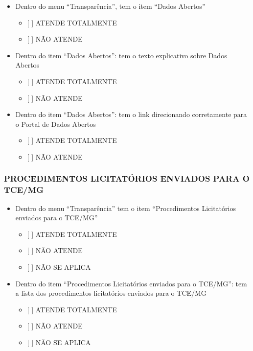 \documentclass[]{book}
\providecommand{\tightlist}{%
  \setlength{\itemsep}{0pt}\setlength{\parskip}{0pt}}
\begin{document}
\begin{itemize}
\tightlist
\item
  Dentro do menu ``Transparência'', tem o item ``Dados Abertos''

  \begin{itemize}
  \tightlist
  \item
    {[} {]} ATENDE TOTALMENTE
  \item
    {[} {]} NÃO ATENDE
  \end{itemize}
\item
  Dentro do item ``Dados Abertos'': tem o texto explicativo sobre Dados Abertos

  \begin{itemize}
  \tightlist
  \item
    {[} {]} ATENDE TOTALMENTE
  \item
    {[} {]} NÃO ATENDE
  \end{itemize}
\item
  Dentro do item ``Dados Abertos'': tem o link direcionando corretamente para o Portal de Dados Abertos

  \begin{itemize}
  \tightlist
  \item
    {[} {]} ATENDE TOTALMENTE
  \item
    {[} {]} NÃO ATENDE
  \end{itemize}
\end{itemize}

\hypertarget{procedimentos-licitatuxf3rios-enviados-para-o-tcemg-1}{%
\subsubsection*{PROCEDIMENTOS LICITATÓRIOS ENVIADOS PARA O TCE/MG}\label{procedimentos-licitatuxf3rios-enviados-para-o-tcemg-1}}

\begin{itemize}
\tightlist
\item
  Dentro do menu ``Transparência'' tem o item ``Procedimentos Licitatórios enviados para o TCE/MG''

  \begin{itemize}
  \tightlist
  \item
    {[} {]} ATENDE TOTALMENTE
  \item
    {[} {]} NÃO ATENDE
  \item
    {[} {]} NÃO SE APLICA
  \end{itemize}
\item
  Dentro do item ``Procedimentos Licitatórios enviados para o TCE/MG'': tem a lista dos procedimentos licitatórios enviados para o TCE/MG

  \begin{itemize}
  \tightlist
  \item
    {[} {]} ATENDE TOTALMENTE
  \item
    {[} {]} NÃO ATENDE
  \item
    {[} {]} NÃO SE APLICA
  \end{itemize}
\end{itemize}
\end{document}
